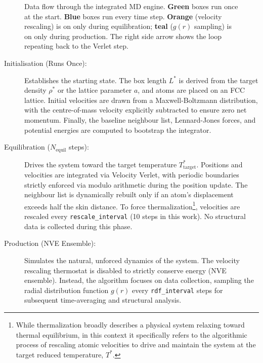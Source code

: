 \begin{figure}[H]
\caption{Data flow through the integrated MD engine. \textbf{Green} boxes run once at the start. \textbf{Blue} boxes run every time step. \textbf{Orange} (velocity rescaling) is on only during equilibration; \textbf{teal} ($g(r)$ sampling) is on only during production. The right side arrow shows the loop repeating back to the Verlet step.}
\label{fig:md_flowchart}
\end{figure}
\begin{description}
    \item[Initialisation (Runs Once):] Establishes the starting state. The box length $L^*$ is derived from the target density $\rho^*$ or the lattice parameter $a$, and atoms are placed on an FCC lattice. Initial velocities are drawn from a Maxwell-Boltzmann distribution, with the centre-of-mass velocity explicitly subtracted to ensure zero net momentum. Finally, the baseline neighbour list, Lennard-Jones forces, and potential energies are computed to bootstrap the integrator.

    \item[Equilibration ($N_{\text{equil}}$ steps):] Drives the system toward the target temperature $T^*_{\text{target}}$. Positions and velocities are integrated via Velocity Verlet, with periodic boundaries strictly enforced via modulo arithmetic during the position update. The neighbour list is dynamically rebuilt only if an atom's displacement exceeds half the skin distance. To force thermalization\footnote{While thermalization broadly describes a physical system relaxing toward thermal equilibrium, in this context it specifically refers to the algorithmic process of rescaling atomic velocities to drive and maintain the system at the target reduced temperature, $T^*$.}, velocities are rescaled every \texttt{rescale\_interval} (10 steps in this work). No structural data is collected during this phase.

    \item[Production (NVE Ensemble):] Simulates the natural, unforced dynamics of the system. The velocity rescaling thermostat is disabled to strictly conserve energy (NVE ensemble). Instead, the algorithm focuses on data collection, sampling the radial distribution function $g(r)$ every \texttt{rdf\_interval} steps for subsequent time-averaging and structural analysis.
\end{description}

